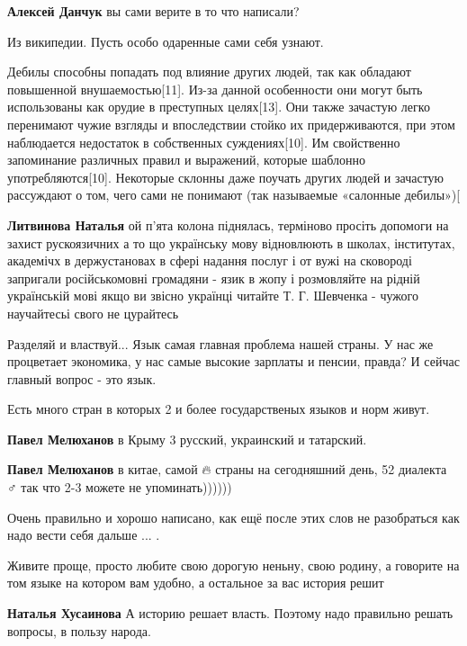\begin{itemize}
{\begin{itemize}
\textbf{Алексей Данчук} вы сами верите в то что написали?

Из википедии. Пусть особо одаренные сами себя узнают.

Дебилы способны попадать под влияние других людей, так как обладают повышенной
внушаемостью[11]. Из-за данной особенности они могут быть использованы как
орудие в преступных целях[13]. Они также зачастую легко перенимают чужие
взгляды и впоследствии стойко их придерживаются, при этом наблюдается
недостаток в собственных суждениях[10]. Им свойственно запоминание различных
правил и выражений, которые шаблонно употребляются[10]. Некоторые склонны даже
поучать других людей и зачастую рассуждают о том, чего сами не понимают (так
называемые «салонные дебилы»)[

\textbf{Литвинова Наталья} ой п'ята колона піднялась, терміново просіть
допомоги на захист рускоязичних а то що українську мову відновлюють в школах,
інститутах, академічх в держустановах в сфері надання послуг і от вужі на
сковороді запригали російськомовні громадяни - язик в жопу і розмовляйте на
рідній українській мові якщо ви звісно українці читайте Т. Г. Шевченка - чужого
научайтесьі свого не цурайтесь

\end{itemize}


Разделяй и властвуй... Язык самая главная проблема нашей страны. У нас же
процветает экономика, у нас самые высокие зарплаты и пенсии, правда? И сейчас
главный вопрос - это язык.

Есть много стран в которых 2 и более государственых языков и норм живут.

\textbf{Павел Мелюханов} в Крыму 3 русский, украинский и татарский.

\textbf{Павел Мелюханов} в китае, самой 🔥 страны на сегодняшний день, 52
диалекта 🤷♂️ так что 2-3 можете не упоминать))))))

Очень правильно и хорошо написано, как ещё после этих слов не разобраться как
надо вести себя дальше ... .


Живите проще, просто любите свою дорогую неньну, свою родину, а говорите на том
языке на котором вам удобно, а остальное за вас история решит

\textbf{Наталья Хусаинова} А историю решает власть. Поэтому надо правильно
решать вопросы, в пользу народа.

}
\end{itemize}
